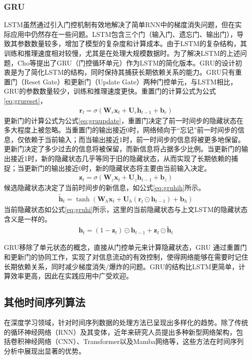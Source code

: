 \subsubsection{GRU}
LSTM虽然通过引入门控机制有效地解决了简单RNN中的梯度消失问题，但在实际应用中仍然存在一些问题。LSTM包含三个门（输入门、遗忘门、输出门），导致其参数数量较多，增加了模型的复杂度和计算成本。由于LSTM的复杂结构，其训练和推理速度相对较慢，尤其是在处理大规模数据时。为了解决LSTM的上述问题，Cho等提出了GRU（门控循环单元）作为LSTM的简化版本\cite{choLearningPhraseRepresentations2014}。GRU的设计初衷是为了简化LSTM的结构，同时保持其捕获长期依赖关系的能力。GRU只有重置门（Reset Gate）和更新门（Update Gate）两种门控单元，与LSTM相比，GRU的参数数量较少，训练和推理速度更快。重置门的计算公式为公式\eqref{eq:grureset}，
\begin{align}
  \mathbf{r}_t = \sigma(\mathbf{W}_r \mathbf{x}_t + \mathbf{U}_r \mathbf{h}_{t-1} + \mathbf{b}_r) \label{eq:grureset}
\end{align}
更新门的计算公式为公式\eqref{eq:gruupdate}，重置门决定了前一时间步的隐藏状态在多大程度上被忽略。当重置门的输出接近0时，网络倾向于“忘记”前一时间步的信息，仅依赖于当前输入；而当输出接近1时，前一时间步的信息将被更多地保留。
更新门决定了多少过去的信息将被保留，而新信息将占据多少比例。当更新门的输出接近1时，新的隐藏状态几乎等同于旧的隐藏状态，从而实现了长期依赖的捕捉；当更新门的输出接近0时，新的隐藏状态将主要由当前输入决定。
\begin{align}
  \mathbf{z}_t = \sigma(\mathbf{W}_z \mathbf{x}_t + \mathbf{U}_z \mathbf{h}_{t-1} + \mathbf{b}_z) \label{eq:gruupdate}
\end{align}
候选隐藏状态决定了当前时间步的新信息，如公式\eqref{eq:gruhih}所示。
\begin{align}
  \tilde{\mathbf{h}}_t = \tanh(\mathbf{W}_h \mathbf{x}_t + \mathbf{U}_h (\mathbf{r}_t \odot \mathbf{h}_{t-1}) + \mathbf{b}_h) \label{eq:gruhih}
\end{align}
当前隐藏状态如公式\eqref{eq:gruhi}所示，这里的当前隐藏状态与上文LSTM的隐藏状态含义是一样的。
\begin{align}
  \mathbf{h}_t = (1 - \mathbf{z}_t) \odot \mathbf{h}_{t-1} + \mathbf{z}_t \odot \tilde{\mathbf{h}}_t \label{eq:gruhi}
\end{align}

GRU移除了单元状态的概念，直接从门控单元来计算隐藏状态，GRU 通过重置门和更新门的协同工作，实现了对信息流动的有效控制，使得网络能够在需要时记住长期依赖关系，同时减少梯度消失/爆炸的问题。GRU的结构比LSTM更简单，计算效率更高，因此在实践应用中广受欢迎。
\subsection{其他时间序列算法}
在深度学习领域，针对时间序列数据的处理方法已呈现出多样化的趋势。除了传统的循环神经网络（RNN）及其变体，近年来研究人员提出多种新型网络架构，包括卷积神经网络（CNN）、Transformer以及Mamba网络等，这些方法在时间序列分析中展现出显著的优势。

